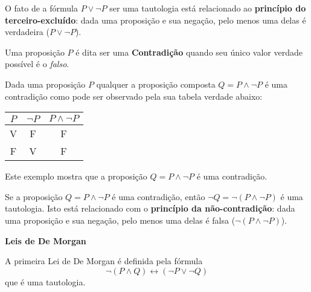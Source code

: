  \colorbox{amarelo}{
 \begin{minipage}{14cm}
 \begin{center}
 O fato de a fórmula $P \lor \neg P$ ser uma tautologia está relacionado ao \textbf{princípio do terceiro-excluído}: dada uma proposição e sua negação, pelo menos uma delas é verdadeira ($P \lor \neg P$).
 \end{center}
 \end{minipage}}

 \vskip0.3cm

 \colorbox{azul}{
 \begin{minipage}{14cm}
 \begin{center}
 Uma proposição $P$ é dita ser uma \textbf{Contradição} quando seu único valor verdade possível é o \emph{falso}.
 \end{center}
 \end{minipage}}

 \vskip0.3cm

\begin{exem}
  Dada uma proposição $P$ qualquer a proposição composta $Q= P \land \neg P$ é uma contradição como pode ser observado pela sua tabela verdade abaixo:
  \begin{table}[H]
  \centering
  \begin{tabular}{|c|c|c|} \hline
  \rowcolor{cinza}
  $P$ & $\neg P$ & $P \land \neg P$ \\ \hline
  V & F & F \\ \hline
  F & V & F \\ \hline
  \end{tabular}
  \end{table}
\end{exem}

 Este exemplo mostra que a proposição $Q= P \land \neg P$ é uma contradição.

 \vskip0.3cm

 \colorbox{amarelo}{
 \begin{minipage}{14cm}
 \begin{center}
 Se a proposição $Q= P \land \neg P$ é uma contradição, então $\neg Q= \neg ( P \land \neg P)$ é uma tautologia. Isto está relacionado com o \textbf{princípio da não-contradição}: dada uma proposição e sua negação, pelo menos uma delas é falsa ($\neg(P \land \neg P)$).
 \end{center}
 \end{minipage}}

 \vskip0.3cm

 \colorbox{azul}{
 \begin{minipage}{14cm}
 \begin{center}
 \textbf{Leis de De Morgan}

 A primeira Lei de De Morgan é definida pela fórmula
 \[\neg(P \land Q) \leftrightarrow (\neg P \lor \neg Q)\]
 que é uma tautologia.
 \end{center}
 \end{minipage}}

